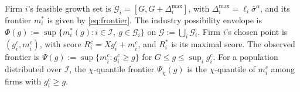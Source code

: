 \begin{definition}\label{def:industry}
Firm $i$'s feasible growth set is $\mathcal G_i=[G,G+\Delta_i^{\max}]$, with $\Delta_i^{\max}=\ell_i\bar\sigma^{\alpha}$, and its frontier $m_i^*$ is given by \eqref{eq:frontier}. The industry possibility envelope is $\Phi(g):=\sup\{m_i^*(g):i\in\mathcal I,\ g\in\mathcal G_i\}$ on $\mathcal G:=\bigcup_i\mathcal G_i$. Firm $i$'s chosen point is $(g_i^c,m_i^c)$, with score $R_i^c=Xg_i^c+m_i^c$, and $R_i^*$ is its maximal score. The observed frontier is $\Psi(g):=\sup\{m_i^c:g_i^c\ge g\}$ for $G\le g\le\sup_ig_i^c$. For a population distributed over $\mathcal I$, the $\chi$-quantile frontier $\Psi_\chi(g)$ is the $\chi$-quantile of $m_i^c$ among firms with $g_i^c\ge g$.
\end{definition}

